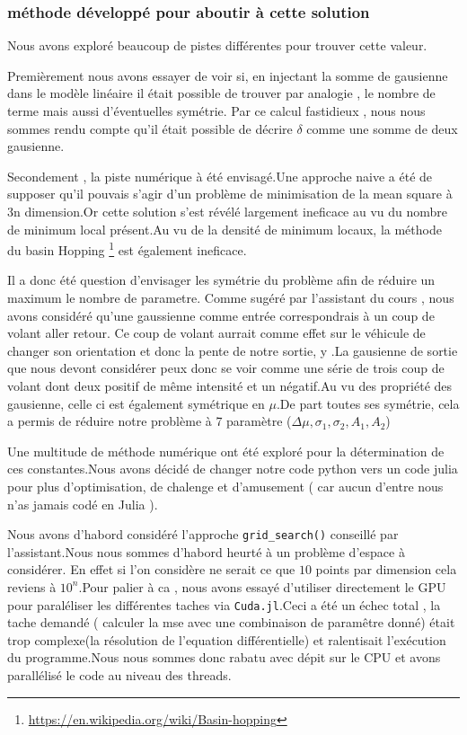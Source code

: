 \documentclass[11pt,a4paper]{article}
\begin{document}
\subsubsection{méthode développé pour aboutir à cette solution}
Nous avons exploré beaucoup de pistes différentes pour trouver cette valeur. 
\par Premièrement nous avons essayer de voir si, en injectant la somme de gausienne dans le modèle linéaire il était possible de trouver par analogie , le nombre de terme mais aussi d'éventuelles symétrie. Par ce calcul fastidieux , nous nous sommes rendu compte qu'il était possible de décrire $\delta$ comme une somme de deux gausienne. 
\par Secondement , la piste numérique à été envisagé.Une approche naive a été de supposer qu'il pouvais s'agir d'un problème de minimisation de la mean square à 3n dimension.Or cette solution s'est révélé largement ineficace au vu du nombre de minimum local présent.Au vu de la densité de minimum locaux, la méthode du basin Hopping \footnote{\url{https://en.wikipedia.org/wiki/Basin-hopping}} est également ineficace.
\par Il a donc été question d'envisager les symétrie du problème afin de réduire un maximum le nombre de parametre. Comme sugéré par l'assistant du cours , nous avons considéré qu'une gaussienne comme entrée correspondrais à un coup de volant aller retour. Ce coup de volant aurrait comme effet sur le véhicule de changer son orientation et donc la pente de notre sortie, y .La gausienne de sortie que nous devont considérer peux donc se voir comme une série de trois coup de volant dont deux positif de même intensité et un négatif.Au vu des propriété des gausienne, celle ci est également symétrique en $\mu$.De part toutes ses symétrie, cela a permis de réduire notre problème à 7 paramètre ($\Delta \mu , \sigma_1, \sigma_2 , A_1 , A_2$)

\par Une multitude de méthode numérique ont été exploré pour la détermination de ces constantes.Nous avons décidé de changer notre code python vers un code julia pour plus d'optimisation, de chalenge et d'amusement ( car aucun d'entre nous n'as jamais codé en Julia ).
\par Nous avons d'habord considéré l'approche \texttt{grid\_search()} conseillé par l'assistant.Nous nous sommes d'habord heurté à un problème d'espace à considérer. En effet si l'on considère ne serait ce que $10$ points par dimension cela reviens à $10^n$.Pour palier à ca , nous avons essayé d'utiliser directement le GPU pour paraléliser les différentes taches via \texttt{Cuda.jl}.Ceci a été un échec total , la tache demandé ( calculer la mse avec une combinaison de paramêtre donné) était trop complexe(la résolution de l'equation différentielle) et ralentisait l'exécution du programme.Nous nous sommes donc rabatu avec dépit sur le CPU et avons parallélisé le code au niveau des threads.
 
\end{document}
